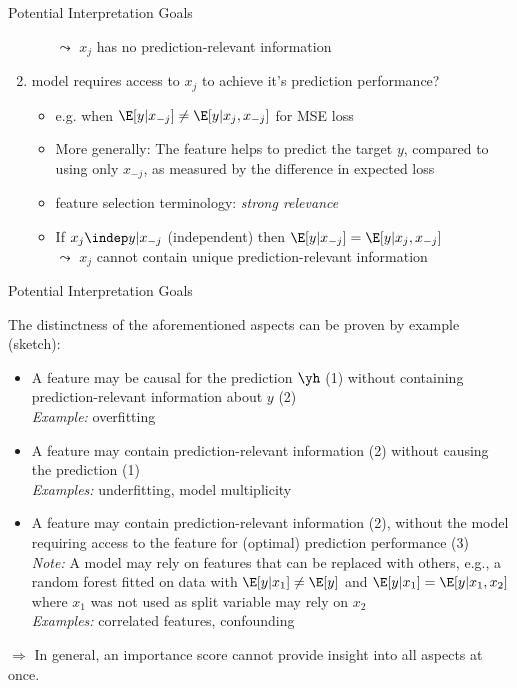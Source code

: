 \begin{vbframe}{Potential Interpretation Goals}
\begin{enumerate}
\begin{itemize}
      $\leadsto$ $x_j$ has no prediction-relevant information
    \end{itemize}
    \item<3|only@3> model requires access to $x_j$ to achieve it's prediction performance?
    \begin{itemize}
      \item e.g. when $\E[y|x_{-j}] \neq \E[y|x_j, x_{-j}]$ for MSE loss
      \item More generally: The feature helps to predict the target $y$, compared to using only $x_{-j}$, as measured by the difference in expected loss
      \item feature selection terminology: \textit{strong relevance} 
      \item If $x_j \indep y | x_{-j}$ (independent) then $\E[y|x_{-j}] = \E[y|x_j, x_{-j}]$ \\
      $\leadsto$ $x_j$ cannot contain unique prediction-relevant information
    \end{itemize}
\end{enumerate}
\end{vbframe}

\begin{vbframe}{Potential Interpretation Goals}

The distinctness of the aforementioned aspects can be proven by example (sketch):

\begin{itemize}
  \item A feature may be causal for the prediction $\yh$ (1) without containing prediction-relevant information about $y$ (2)\\
  \textit{Example:} overfitting
  \item A feature may contain prediction-relevant information (2) without causing the prediction (1)\\ \textit{Examples:} underfitting, model multiplicity
  \item A feature may contain prediction-relevant information (2), without the model requiring access to the feature for (optimal) prediction performance (3)\\
  \textit{Note:} A model may rely on features that can be replaced with others, e.g., a random forest fitted on data with $\E[y|x_1] \neq \E[y]$ and $\E[y|x_1] = \E[y|x_1, x_2]$ where $x_1$ was not used as split variable may rely on $x_2$ %
  \\
  \textit{Examples:} correlated features, confounding
  \end{itemize}
$\Rightarrow$ In general, an importance score cannot provide insight into all aspects at once.
\end{vbframe}



